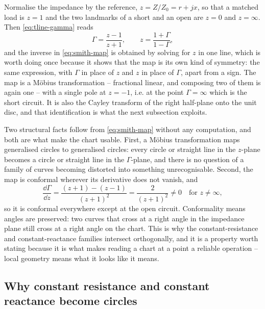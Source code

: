 Normalise the impedance by the reference, $z=Z/Z_0=r+jx$, so that a matched load is $z=1$ and the two landmarks
of a short and an open are $z=0$ and $z=\infty$. Then \eqref{eq:tline-gamma} reads
\begin{equation}
  \Gamma = \frac{z-1}{z+1},
  \qquad
  z = \frac{1+\Gamma}{1-\Gamma} ,
  \label{eq:smith-map}
\end{equation}
and the inverse in \eqref{eq:smith-map} is obtained by solving for $z$ in one line, which is worth doing once
because it shows that the map is its own kind of symmetry: the same expression, with $\Gamma$ in place of $z$ and
$z$ in place of $\Gamma$, apart from a sign. The map is a M\"obius transformation -- fractional linear, and
composing two of them is again one -- with a single pole at $z=-1$, i.e. at the point $\Gamma=\infty$ which is the
short circuit. It is also the Cayley transform of the right half-plane onto the unit disc, and that identification
is what the next subsection exploits.

Two structural facts follow from \eqref{eq:smith-map} without any computation, and both are what make the chart
usable. First, a M\"obius transformation maps generalised circles to generalised circles: every circle or straight
line in the $z$-plane becomes a circle or straight line in the $\Gamma$-plane, and there is no question of a
family of curves becoming distorted into something unrecognisable. Second, the map is conformal wherever its
derivative does not vanish, and
\begin{equation}
  \frac{\dd\Gamma}{\dd z} = \frac{(z+1)-(z-1)}{(z+1)^2} = \frac{2}{(z+1)^2} \neq 0
  \quad\text{for } z\neq\infty ,
  \label{eq:smith-derivative}
\end{equation}
so it is conformal everywhere except at the open circuit. Conformality means angles are preserved: two curves
that cross at a right angle in the impedance plane still cross at a right angle on the chart. This is why the
constant-resistance and constant-reactance families intersect orthogonally, and it is a property worth stating
because it is what makes reading a chart at a point a reliable operation -- local geometry means what it looks
like it means.

\subsection{Why constant resistance and constant reactance become circles}
\label{sec:smith-circles}

